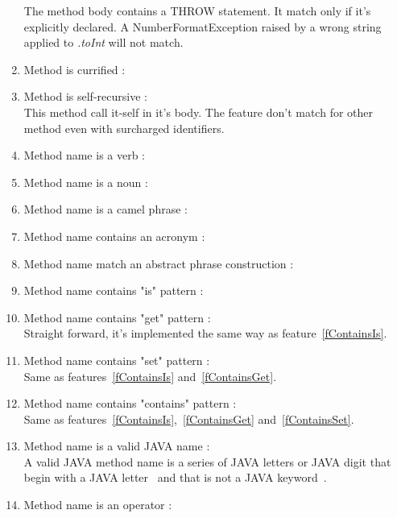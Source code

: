 \documentclass[12pt]{article}
\begin{document}
\begin{enumerate}
	The method body contains a THROW statement. It match only if it's explicitly declared. A NumberFormatException raised by a wrong string applied to \textit{.toInt} will not match.
\item Method is currified : 
\item Method is self-recursive : \\
	This method call it-self in it's body. The feature don't match for other method even with surcharged identifiers.
\item Method name is a verb : 
\item Method name is a noun :
\item Method name is a camel phrase :
\item Method name contains an acronym :
\item Method name match an abstract phrase construction : 
\item Method name contains "is" pattern :\label{fContainsIs}
\item Method name contains "get" pattern :\label{fContainsGet}\\
	Straight forward, it's implemented the same way as feature~\ref{fContainsIs}.
\item Method name contains "set" pattern :\label{fContainsSet}\\
	Same as features~\ref{fContainsIs} and~\ref{fContainsGet}.
\item Method name contains "contains" pattern :\\
	Same as features~\ref{fContainsIs},~\ref{fContainsGet} and~\ref{fContainsSet}.
\item Method name is a valid JAVA name :\\
	A valid JAVA method name is a series of JAVA letters or JAVA digit that begin with a JAVA letter~\cite{jls_ident} and that is not a JAVA keyword~\cite{jls_keyword}. %
\item Method name is an operator :\\

\end{enumerate}
\end{document}
